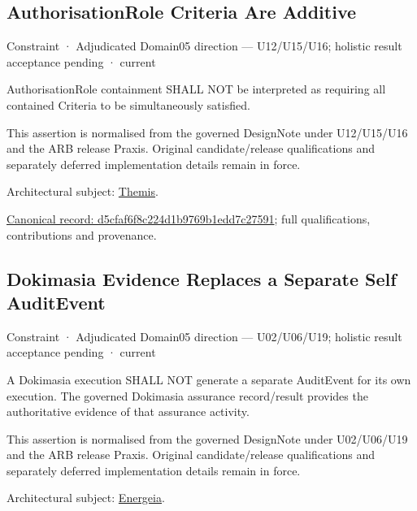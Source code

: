 \subsection{AuthorisationRole Criteria Are Additive}

\label{element:d5cfaf6f8c224d1b9769b1edd7c27591}
{\small Constraint · Adjudicated Domain05 direction — U12/U15/U16; holistic result acceptance pending · current}\par

AuthorisationRole containment SHALL NOT be interpreted as requiring all contained Criteria to be simultaneously satisfied.



This assertion is normalised from the governed DesignNote under U12/U15/U16 and the ARB release Praxis. Original candidate/release qualifications and separately deferred implementation details remain in force.



Architectural subject: \hyperref[element:899d34ec491948b68aad09e507dea6d1]{Themis}.


{\footnotesize \href{../../../../continuum/motivation/constraint/d5cfaf6f8c224d1b9769b1edd7c27591.md}{Canonical record: d5cfaf6f8c224d1b9769b1edd7c27591}; full qualifications, contributions and provenance.}\par
\subsection{Dokimasia Evidence Replaces a Separate Self AuditEvent}

\label{element:e1ce978457e543d5894de24e9be9ac2c}
{\small Constraint · Adjudicated Domain05 direction — U02/U06/U19; holistic result acceptance pending · current}\par

A Dokimasia execution SHALL NOT generate a separate AuditEvent for its own execution. The governed Dokimasia assurance record/result provides the authoritative evidence of that assurance activity.



This assertion is normalised from the governed DesignNote under U02/U06/U19 and the ARB release Praxis. Original candidate/release qualifications and separately deferred implementation details remain in force.



Architectural subject: \hyperref[element:fb3f37a6ac614415ac486a6de9d35994]{Energeia}.


